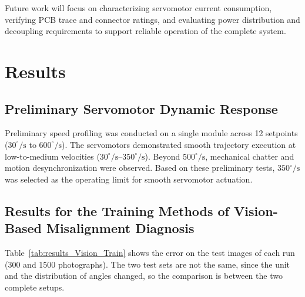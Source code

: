 \documentclass[lettersize,journal]{IEEEtran}
\begin{document}
	Future work will focus on characterizing
	servomotor current consumption, verifying
	PCB trace and connector ratings, and
	evaluating power distribution and
	decoupling requirements to support
	reliable operation of the complete system.
	
	
	\section{Results}
	\label{sec:results}
	
	\subsection{Preliminary Servomotor Dynamic Response}
	Preliminary speed profiling was conducted on a single module across 12 setpoints ($30^\circ/\text{s}$ to $600^\circ/\text{s}$). The servomotors demonstrated smooth trajectory execution at low-to-medium velocities ($30^\circ/\text{s}$--$350^\circ/\text{s}$). Beyond $500^\circ/\text{s}$, mechanical chatter and motion desynchronization were observed. Based on these preliminary tests, $350^\circ/\text{s}$ was selected as the operating limit for smooth servomotor actuation.

	\subsection{Results for the Training Methods of Vision-Based Misalignment Diagnosis}
	
	Table~\ref{tab:results_Vision_Train} shows the error on the test images of each run (300 and 1500 photographs). The two test sets are not the same, since the unit and the distribution of angles changed, so the comparison is between the two complete setups.
	
\end{document}
